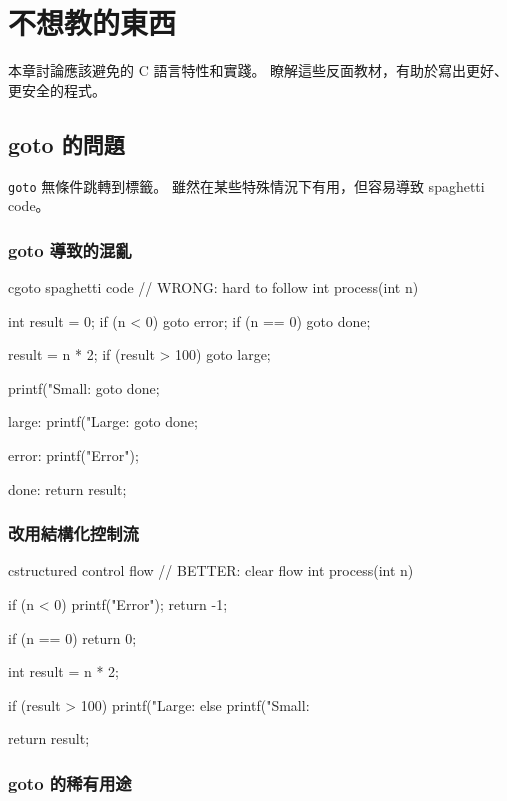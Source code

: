 \chapter{不想教的東西}

本章討論應該避免的 C 語言特性和實踐。 瞭解這些反面教材，有助於寫出更好、更安全的程式。

\section{goto 的問題}

\texttt{goto} 無條件跳轉到標籤。 雖然在某些特殊情況下有用，但容易導致 spaghetti code。

\subsection*{goto 導致的混亂}

\begin{code}{c}{goto spaghetti code}
// WRONG: hard to follow
int process(int n) {
    int result = 0;
    if (n < 0) goto error;
    if (n == 0) goto done;

    result = n * 2;
    if (result > 100) goto large;

    printf("Small: %
    goto done;

large:
    printf("Large: %
    goto done;

error:
    printf("Error\n");

done:
    return result;
}
\end{code}

\subsection*{改用結構化控制流}

\begin{code}{c}{structured control flow}
// BETTER: clear flow
int process(int n) {
    if (n < 0) {
        printf("Error\n");
        return -1;
    }

    if (n == 0) {
        return 0;
    }

    int result = n * 2;

    if (result > 100) {
        printf("Large: %
    } else {
        printf("Small: %
    }

    return result;
}
\end{code}

\subsection*{goto 的稀有用途}

